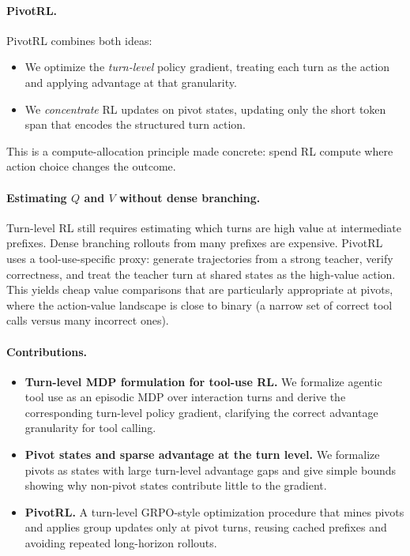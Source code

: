\paragraph{PivotRL.}
PivotRL combines both ideas:
\begin{itemize}
    \item We optimize the \emph{turn-level} policy gradient, treating each turn as the action and applying advantage at that granularity.
    \item We \emph{concentrate} RL updates on pivot states, updating only the short token span that encodes the structured turn action.
\end{itemize}
This is a compute-allocation principle made concrete: spend RL compute where action choice changes the outcome.

\paragraph{Estimating $Q$ and $V$ without dense branching.}
Turn-level RL still requires estimating which turns are high value at intermediate prefixes.
Dense branching rollouts from many prefixes are expensive.
PivotRL uses a tool-use-specific proxy: generate trajectories from a strong teacher, verify correctness, and treat the teacher turn at shared states as the high-value action.
This yields cheap value comparisons that are particularly appropriate at pivots, where the action-value landscape is close to binary (a narrow set of correct tool calls versus many incorrect ones).

\paragraph{Contributions.}
\begin{itemize}
    \item \textbf{Turn-level MDP formulation for tool-use RL.}
    We formalize agentic tool use as an episodic MDP over interaction turns and derive the corresponding turn-level policy gradient, clarifying the correct advantage granularity for tool calling.
    \item \textbf{Pivot states and sparse advantage at the turn level.}
    We formalize pivots as states with large turn-level advantage gaps and give simple bounds showing why non-pivot states contribute little to the gradient.
    \item \textbf{PivotRL.}
    A turn-level GRPO-style optimization procedure that mines pivots and applies group updates only at pivot turns, reusing cached prefixes and avoiding repeated long-horizon rollouts.
\end{itemize}

